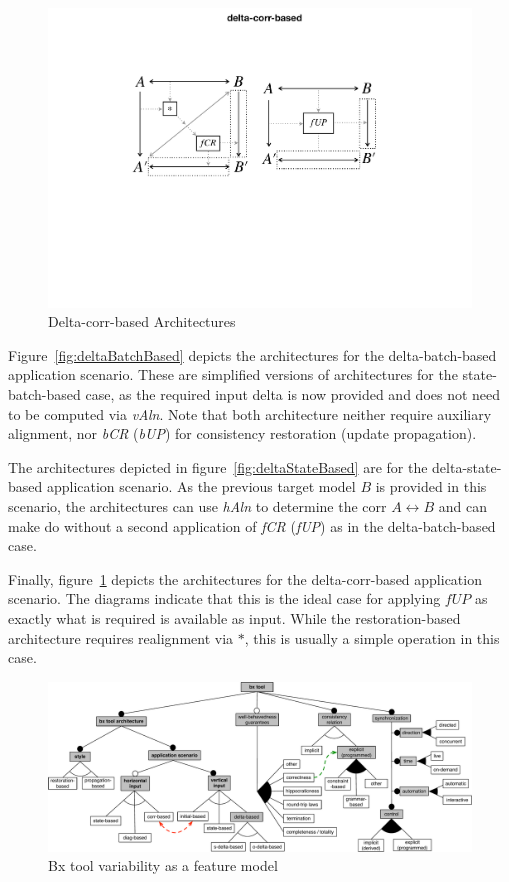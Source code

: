 \begin{figure}[tb!]
	\centering
	\includegraphics[width=0.75\columnwidth]{diagrams/foundations/delta-corr-based}
	\caption{Delta-corr-based Architectures}
	\label{fig:deltaCorrBased}
\end{figure}

Figure~\ref{fig:deltaBatchBased} depicts the architectures for the delta-batch-based application scenario.
These are simplified versions of architectures for the state-batch-based case, as the required input delta is now provided and does not need to be computed via \emph{vAln}.
Note that both architecture neither require auxiliary alignment, nor \emph{bCR} (\emph{bUP}) for consistency restoration (update propagation).  

The architectures depicted in figure~\ref{fig:deltaStateBased} are for the delta-state-based application scenario.
As the previous target model $B$ is provided in this scenario, the architectures can use \emph{hAln} to determine the corr $A \leftrightarrow B$ and can make do without a second application of \emph{fCR} (\emph{fUP}) as in the delta-batch-based case.  

Finally, figure~\ref{fig:deltaCorrBased} depicts the architectures for the delta-corr-based application scenario.
The diagrams indicate that this is the ideal case for applying $\mathit{fUP}$ as exactly what is required is available as input.
While the restoration-based architecture requires realignment via $\ast$, this is usually a simple operation in this case.

\begin{figure}[tb!]
	\centering
	\includegraphics[width=\textwidth]{diagrams/foundations/feature-model-bx-tool}
	\caption{Bx tool variability as a feature model}
	\label{fig:featureModelBxTools}
\end{figure}

